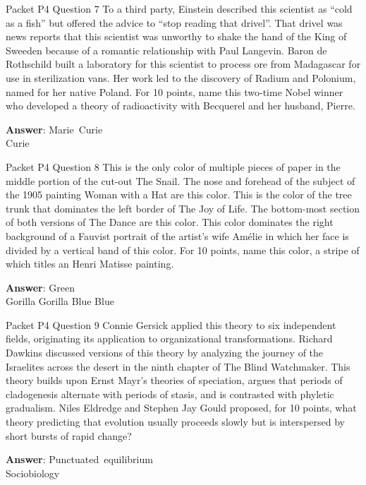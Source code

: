 \begin{frame}{Packet P4 Question 7}
To a third party, Einstein described this scientist as ``cold as a fish'' but offered the advice to ``stop reading that drivel''.  That drivel was news reports that this scientist was unworthy to shake the hand of the King of Sweeden because of a romantic relationship with Paul Langevin.  Baron de Rothschild built a laboratory for this scientist to process ore from Madagascar for use in sterilization vans.  Her work led to the discovery of Radium and Polonium, named       for her native Poland.  For 10 points,   name this two-time Nobel winner who developed a theory of radioactivity with Becquerel and her husband,   Pierre.

\textbf{Answer}: Marie\ Curie\\
 Curie
\end{frame}

\begin{frame}{Packet P4 Question 8}
This is the only color   of multiple pieces of paper in the middle portion of the cut-out The Snail. The nose and forehead of the subject of the 1905 painting Woman with a Hat are this color. This is the color of the tree trunk that dominates the left border of The Joy of Life. The bottom-most section of both versions of The Dance are this color. This color dominates the right background of a Fauvist portrait of the artist’s wife Amélie in which her face is divided by a vertical band of this color. For 10 points, name this color, a stripe of which titles an Henri Matisse painting.        

\textbf{Answer}: Green\\
 Gorilla
 Gorilla
 Blue
 Blue
\end{frame}

\begin{frame}{Packet P4 Question 9}
Connie Gersick applied this theory to six independent fields, originating its application to organizational transformations. Richard Dawkins discussed   versions of this theory by analyzing the journey of the Israelites across the desert in the ninth chapter of The Blind Watchmaker. This theory builds upon   Ernst Mayr’s theories of speciation,   argues that periods of cladogenesis alternate   with periods of stasis, and is contrasted with phyletic gradualism. Niles   Eldredge and Stephen Jay Gould proposed, for 10 points, what theory predicting that evolution usually proceeds slowly but is interspersed by short bursts of rapid change?

\textbf{Answer}: Punctuated\ equilibrium\\
 Sociobiology
\end{frame}

